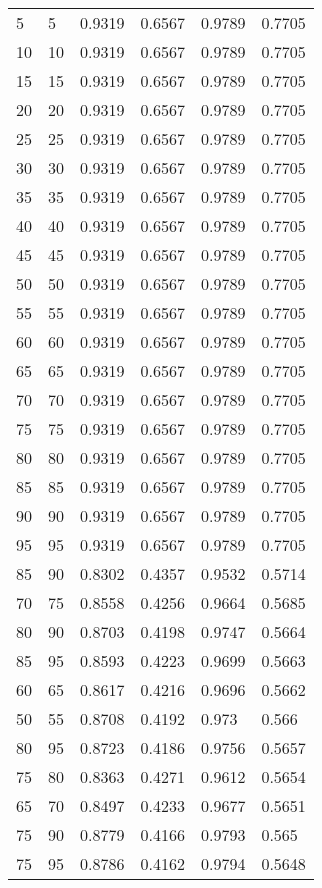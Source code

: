 \begin{center}
\begin{longtable}{|l|l|l|l|l|l|}
5  & 5  & 0.9319 & 0.6567 & 0.9789 & 0.7705 \\
10 & 10 & 0.9319 & 0.6567 & 0.9789 & 0.7705 \\
15 & 15 & 0.9319 & 0.6567 & 0.9789 & 0.7705 \\
20 & 20 & 0.9319 & 0.6567 & 0.9789 & 0.7705 \\
25 & 25 & 0.9319 & 0.6567 & 0.9789 & 0.7705 \\
30 & 30 & 0.9319 & 0.6567 & 0.9789 & 0.7705 \\
35 & 35 & 0.9319 & 0.6567 & 0.9789 & 0.7705 \\
40 & 40 & 0.9319 & 0.6567 & 0.9789 & 0.7705 \\
45 & 45 & 0.9319 & 0.6567 & 0.9789 & 0.7705 \\
50 & 50 & 0.9319 & 0.6567 & 0.9789 & 0.7705 \\
55 & 55 & 0.9319 & 0.6567 & 0.9789 & 0.7705 \\
60 & 60 & 0.9319 & 0.6567 & 0.9789 & 0.7705 \\
65 & 65 & 0.9319 & 0.6567 & 0.9789 & 0.7705 \\
70 & 70 & 0.9319 & 0.6567 & 0.9789 & 0.7705 \\
75 & 75 & 0.9319 & 0.6567 & 0.9789 & 0.7705 \\
80 & 80 & 0.9319 & 0.6567 & 0.9789 & 0.7705 \\
85 & 85 & 0.9319 & 0.6567 & 0.9789 & 0.7705 \\
90 & 90 & 0.9319 & 0.6567 & 0.9789 & 0.7705 \\
95 & 95 & 0.9319 & 0.6567 & 0.9789 & 0.7705 \\
85 & 90 & 0.8302 & 0.4357 & 0.9532 & 0.5714 \\
70 & 75 & 0.8558 & 0.4256 & 0.9664 & 0.5685 \\
80 & 90 & 0.8703 & 0.4198 & 0.9747 & 0.5664 \\
85 & 95 & 0.8593 & 0.4223 & 0.9699 & 0.5663 \\
60 & 65 & 0.8617 & 0.4216 & 0.9696 & 0.5662 \\
50 & 55 & 0.8708 & 0.4192 & 0.973  & 0.566  \\
80 & 95 & 0.8723 & 0.4186 & 0.9756 & 0.5657 \\
75 & 80 & 0.8363 & 0.4271 & 0.9612 & 0.5654 \\
65 & 70 & 0.8497 & 0.4233 & 0.9677 & 0.5651 \\
75 & 90 & 0.8779 & 0.4166 & 0.9793 & 0.565  \\
75 & 95 & 0.8786 & 0.4162 & 0.9794 & 0.5648 \\

\end{longtable}
\end{center}
